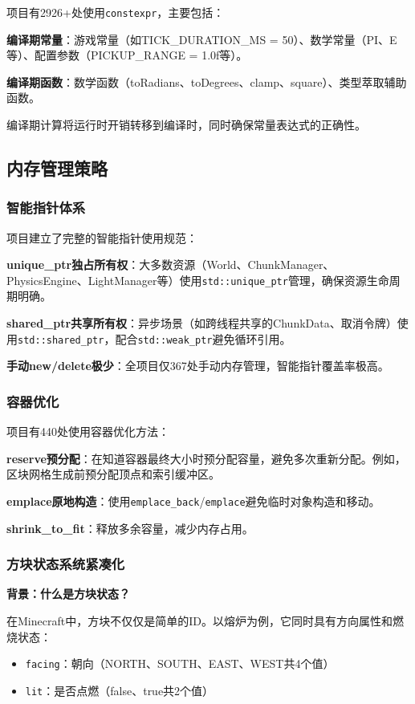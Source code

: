 项目有2926+处使用\texttt{constexpr}，主要包括：

\textbf{编译期常量}：游戏常量（如TICK\_DURATION\_MS = 50）、数学常量（PI、E等）、配置参数（PICKUP\_RANGE = 1.0f等）。

\textbf{编译期函数}：数学函数（toRadians、toDegrees、clamp、square）、类型萃取辅助函数。

编译期计算将运行时开销转移到编译时，同时确保常量表达式的正确性。

\subsection{内存管理策略}

\subsubsection{智能指针体系}

项目建立了完整的智能指针使用规范：

\textbf{unique\_ptr独占所有权}：大多数资源（World、ChunkManager、PhysicsEngine、LightManager等）使用\texttt{std::unique\_ptr}管理，确保资源生命周期明确。

\textbf{shared\_ptr共享所有权}：异步场景（如跨线程共享的ChunkData、取消令牌）使用\texttt{std::shared\_ptr}，配合\texttt{std::weak\_ptr}避免循环引用。

\textbf{手动new/delete极少}：全项目仅367处手动内存管理，智能指针覆盖率极高。

\subsubsection{容器优化}

项目有440处使用容器优化方法：

\textbf{reserve预分配}：在知道容器最终大小时预分配容量，避免多次重新分配。例如，区块网格生成前预分配顶点和索引缓冲区。

\textbf{emplace原地构造}：使用\texttt{emplace\_back}/\texttt{emplace}避免临时对象构造和移动。

\textbf{shrink\_to\_fit}：释放多余容量，减少内存占用。

\subsubsection{方块状态系统紧凑化}

\textbf{背景：什么是方块状态？}

在Minecraft中，方块不仅仅是简单的ID。以熔炉为例，它同时具有方向属性和燃烧状态：
\begin{itemize}
    \item \texttt{facing}：朝向（NORTH、SOUTH、EAST、WEST共4个值）
    \item \texttt{lit}：是否点燃（false、true共2个值）
\end{itemize}

